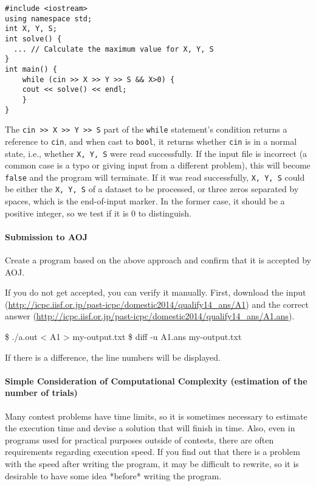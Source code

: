 \begin{cbox}
\begin{verbatim}
#include <iostream>
using namespace std;
int X, Y, S;
int solve() {
  ... // Calculate the maximum value for X, Y, S
}
int main() {
    while (cin >> X >> Y >> S && X>0) {
	cout << solve() << endl;
    }
}
\end{verbatim}
\end{cbox}

The \texttt{cin >> X >> Y >> S} part of the \texttt{while} statement's condition returns a reference to \texttt{cin}, and when cast to \texttt{bool}, it returns whether \texttt{cin} is in a normal state, i.e., whether \texttt{X, Y, S} were read successfully. If the input file is incorrect (a common case is a typo or giving input from a different problem), this will become \texttt{false} and the program will terminate. If it was read successfully, \texttt{X, Y, S} could be either the \texttt{X, Y, S} of a dataset to be processed, or three zeros separated by spaces, which is the end-of-input marker. In the former case, it should be a positive integer, so we test if it is 0 to distinguish.

\paragraph{Submission to AOJ}

Create a program based on the above approach and confirm that it is accepted by AOJ.

If you do not get accepted, you can verify it manually. First, download the input
(\url{http://icpc.iisf.or.jp/past-icpc/domestic2014/qualify14_ans/A1})
and the correct answer
(\url{http://icpc.iisf.or.jp/past-icpc/domestic2014/qualify14_ans/A1.ans}).
\begin{terminal}
  \$ ./a.out < A1 > my-output.txt
  \$ diff -u A1.ans my-output.txt 
\end{terminal}
If there is a difference, the line numbers will be displayed.

\paragraph{Simple Consideration of Computational Complexity (estimation of the number of trials)}
Many contest problems have time limits, so it is sometimes necessary to estimate the execution time and devise a solution that will finish in time. Also, even in programs used for practical purposes outside of contests, there are often requirements regarding execution speed. If you find out that there is a problem with the speed after writing the program, it may be difficult to rewrite, so it is desirable to have some idea *before* writing the program.

